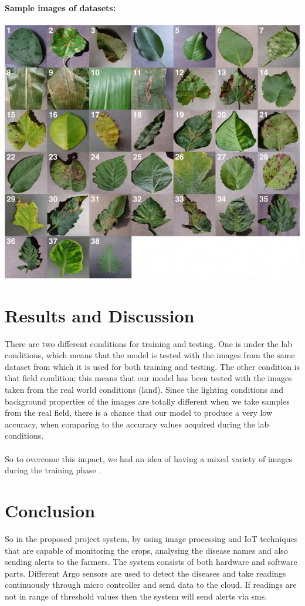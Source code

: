 \documentclass{article}
\begin{document}
\bigskip
\textbf{Sample images of datasets:}\\\\
\includegraphics[width=15cm]{pics/dataset.jpeg}

\section{Results and Discussion}
\large{There are two  different  conditions  for  training  and testing.  One  is  under  the  lab  conditions,  which  means  that the  model  is  tested  with  the  images  from  the  same  dataset from  which  it  is  used  for  both  training  and  testing.    The other  condition  is  that  field  condition;  this  means  that  our model has been tested with the images taken from the real world conditions   (land).   Since   the   lighting   conditions   and background  properties  of  the  images  are  totally  different when we take samples from the real field, there is a chance that  our  model  to  produce  a  very  low  accuracy,  when comparing  to  the  accuracy  values  acquired  during  the  lab conditions.\\\\  
So  to overcome  this  impact,  we  had  an  idea  of having a mixed variety of images during           the training phase .

}

\section{Conclusion}
\large{So in the proposed project system, by using image processing and IoT techniques that are capable of monitoring the crops, analysing the disease names and also sending alerts to the farmers. The system consists of both hardware and software parts. Different Argo sensors are used to detect the diseases and take readings continuously through micro controller and send data to the cloud. If readings are not in range of threshold values then the system will send alerts via sms. 
}
\end{document}
